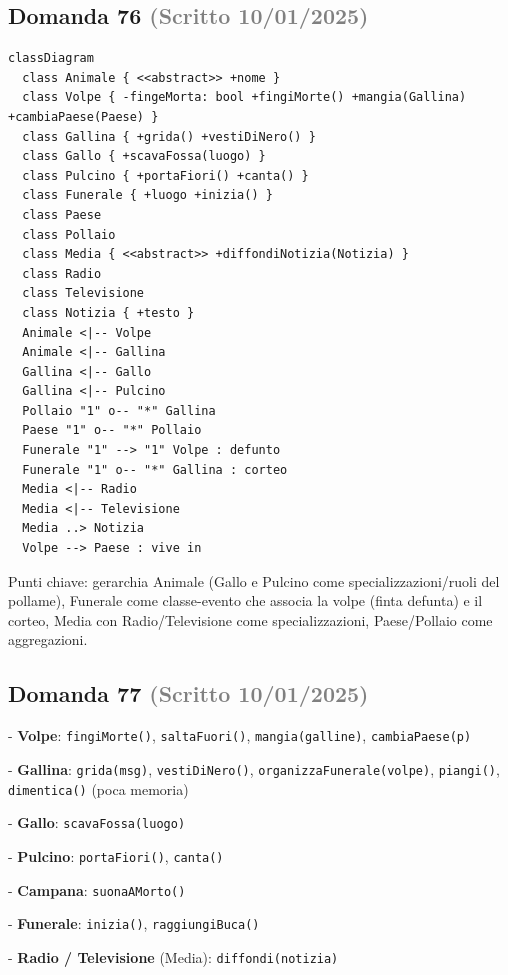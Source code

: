 \documentclass[a4paper,11pt]{article}
\begin{document}
\subsection*{Domanda 76 \hfill {\small \textcolor{gray}{(Scritto 10/01/2025)}}}


\begin{verbatim}
classDiagram
  class Animale { <<abstract>> +nome }
  class Volpe { -fingeMorta: bool +fingiMorte() +mangia(Gallina) +cambiaPaese(Paese) }
  class Gallina { +grida() +vestiDiNero() }
  class Gallo { +scavaFossa(luogo) }
  class Pulcino { +portaFiori() +canta() }
  class Funerale { +luogo +inizia() }
  class Paese
  class Pollaio
  class Media { <<abstract>> +diffondiNotizia(Notizia) }
  class Radio
  class Televisione
  class Notizia { +testo }
  Animale <|-- Volpe
  Animale <|-- Gallina
  Gallina <|-- Gallo
  Gallina <|-- Pulcino
  Pollaio "1" o-- "*" Gallina
  Paese "1" o-- "*" Pollaio
  Funerale "1" --> "1" Volpe : defunto
  Funerale "1" o-- "*" Gallina : corteo
  Media <|-- Radio
  Media <|-- Televisione
  Media ..> Notizia
  Volpe --> Paese : vive in
\end{verbatim}
Punti chiave: gerarchia Animale (Gallo e Pulcino come specializzazioni/ruoli del pollame), Funerale come classe-evento che associa la volpe (finta defunta) e il corteo, Media con Radio/Televisione come specializzazioni, Paese/Pollaio come aggregazioni.



\subsection*{Domanda 77 \hfill {\small \textcolor{gray}{(Scritto 10/01/2025)}}}
- \textbf{Volpe}: \texttt{fingiMorte()}, \texttt{saltaFuori()}, \texttt{mangia(galline)}, \texttt{cambiaPaese(p)}

- \textbf{Gallina}: \texttt{grida(msg)}, \texttt{vestiDiNero()}, \texttt{organizzaFunerale(volpe)}, \texttt{piangi()}, \texttt{dimentica()} (poca memoria)

- \textbf{Gallo}: \texttt{scavaFossa(luogo)}

- \textbf{Pulcino}: \texttt{portaFiori()}, \texttt{canta()}

- \textbf{Campana}: \texttt{suonaAMorto()}

- \textbf{Funerale}: \texttt{inizia()}, \texttt{raggiungiBuca()}

- \textbf{Radio / Televisione} (Media): \texttt{diffondi(notizia)}
\end{document}
